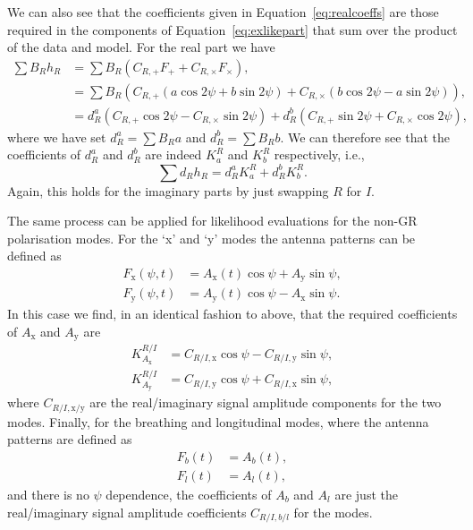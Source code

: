We can also see that the coefficients given in Equation~\ref{eq:realcoeffs} are those required in the components of
Equation~\ref{eq:exlikepart} that sum over the product of the data and model. For the real part we have
\begin{align}
\sum B_Rh_R &= \sum B_R\left(C_{R,+}F_+ + C_{R,\times}F_{\times} \right), \nonumber \\
 &=\sum B_R\left( C_{R,+}\left(a\cos{2\psi}+b\sin{2\psi}\right) + C_{R,\times}\left(b\cos{2\psi} - a\sin{2\psi} \right) \right), \nonumber \\
 &= d^a_R\left(C_{R,+}\cos{2\psi} - C_{R,\times}\sin{2\psi}\right) + d^b_R\left(C_{R,+}\sin{2\psi} + C_{R,\times}\cos{2\psi} \right),
\end{align}
where we have set $d^a_R = \sum B_R a$ and $d^b_R = \sum B_R b$. We can therefore see that the coefficients
of $d^a_R$ and $d^b_R$ are indeed $K_a^R$ and $K_b^R$ respectively, i.e.,
\begin{equation}
\sum d_Rh_R = d^a_RK_a^R + d^b_RK_b^R.
\end{equation}
Again, this holds for the imaginary parts by just swapping $R$ for $I$.

The same process can be applied for likelihood evaluations for the non-GR polarisation modes. For the `x' and `y'
modes the antenna patterns can be defined as \citep[Equations~32 and 33 of][]{2015PhRvD..91h2002I}
\begin{align}
F_{\text{x}}(\psi,t) &= A_{\text{x}}(t)\cos{\psi} + A_{\text{y}}\sin{\psi}, \nonumber \\
F_{\text{y}}(\psi,t) &= A_{\text{y}}(t)\cos{\psi} - A_{\text{x}}\sin{\psi}.
\end{align}
In this case we find, in an identical fashion to above, that the required coefficients of $A_{\text{x}}$ and $A_{\text{y}}$ are
\begin{align}\label{eq:realcoeffsxy}
K_{A_{\text{x}}}^{R/I} &= C_{R/I,\text{x}}\cos{\psi} - C_{R/I,\text{y}}\sin{\psi}, \nonumber \\
K_{A_{\text{y}}}^{R/I} &= C_{R/I,\text{y}}\cos{\psi} + C_{R/I,\text{x}}\sin{\psi},
\end{align}
where $C_{R/I,\text{x}/\text{y}}$ are the real/imaginary signal amplitude components for the two modes.
Finally, for the breathing and longitudinal modes, where the antenna patterns are defined as \citep[Equations~34 and 35 of][]{2015PhRvD..91h2002I}
\begin{align}
F_{b}(t) &= A_{b}(t), \nonumber \\
F_{l}(t) &= A_{l}(t),
\end{align}
and there is no $\psi$ dependence, the coefficients of $A_{b}$ and $A_l$ are just the real/imaginary signal amplitude coefficients $C_{R/I,b/l}$ for the modes.